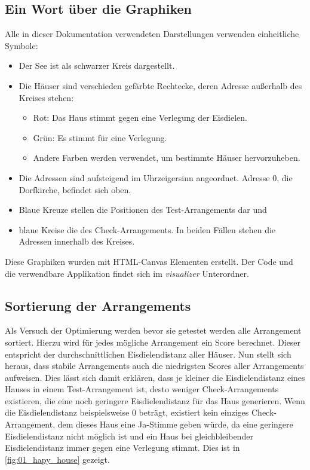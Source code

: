 \documentclass[a4paper,10pt,ngerman,captions=figureheading]{scrartcl}
\begin{document}
\subsection{Ein Wort über die Graphiken}
Alle in dieser Dokumentation verwendeten Darstellungen verwenden einheitliche Symbole:
\begin{itemize}
    \item Der See ist als schwarzer Kreis dargestellt.
    \item Die Häuser sind verschieden gefärbte Rechtecke, deren Adresse außerhalb des Kreises stehen:
          \begin{itemize}
              \item Rot: Das Haus stimmt gegen eine Verlegung der Eisdielen.
              \item Grün: Es stimmt für eine Verlegung.
              \item Andere Farben werden verwendet, um bestimmte Häuser hervorzuheben.
          \end{itemize}
    \item Die Adressen sind aufsteigend im Uhrzeigersinn angeordnet.
          Adresse $0$, die Dorfkirche, befindet sich oben.
    \item Blaue Kreuze stellen die Positionen des Test-Arrangements dar und
    \item blaue Kreise die des Check-Arrangements.
          In beiden Fällen stehen die Adressen innerhalb des Kreises.
\end{itemize}
Diese Graphiken wurden mit HTML-Canvas Elementen erstellt.
Der Code und die verwendbare Applikation findet sich im \textit{visualizer} Unterordner.

\subsection{Sortierung der Arrangements}
\label{sec:Sortierung_der_Arrangements}
Als Versuch der Optimierung werden bevor sie getestet werden alle Arrangement sortiert.
Hierzu wird für jedes mögliche Arrangement ein Score berechnet.
Dieser entspricht der durchschnittlichen Eisdielendistanz aller Häuser.
Nun stellt sich heraus, dass stabile Arrangements auch die niedrigsten Scores aller Arrangements aufweisen.
Dies lässt sich damit erklären, dass je kleiner die Eisdielendistanz eines Hauses in einem Test-Arrangement ist, desto weniger Check-Arrangements existieren, die eine noch geringere Eisdielendistanz für das Haus generieren.
Wenn die Eisdielendistanz beispielsweise $0$ beträgt, existiert kein einziges Check-Arrangement, dem dieses Haus eine Ja-Stimme geben würde, da eine geringere Eisdielendistanz nicht möglich ist und ein Haus bei gleichbleibender Eisdielendistanz immer gegen eine Verlegung stimmt.
Dies ist in \autoref{fig:01_hapy_house} gezeigt.
\end{document}

